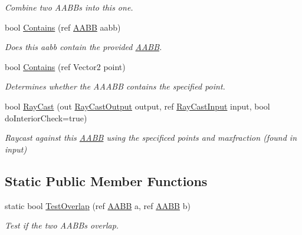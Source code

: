 \begin{DoxyCompactItemize}
\begin{DoxyCompactList}\small\item\em Combine two A\+A\+B\+Bs into this one. \end{DoxyCompactList}\item 
bool \hyperlink{struct_farseer_physics_1_1_collision_1_1_a_a_b_b_acc86c08d41c52dc6170f2a3e7d9187ff}{Contains} (ref \hyperlink{struct_farseer_physics_1_1_collision_1_1_a_a_b_b}{A\+A\+B\+B} aabb)
\begin{DoxyCompactList}\small\item\em Does this aabb contain the provided \hyperlink{struct_farseer_physics_1_1_collision_1_1_a_a_b_b}{A\+A\+B\+B}. \end{DoxyCompactList}\item 
bool \hyperlink{struct_farseer_physics_1_1_collision_1_1_a_a_b_b_a0ad83b468452fe8bd6c99bd0ad665446}{Contains} (ref Vector2 point)
\begin{DoxyCompactList}\small\item\em Determines whether the A\+A\+A\+B\+B contains the specified point. \end{DoxyCompactList}\item 
bool \hyperlink{struct_farseer_physics_1_1_collision_1_1_a_a_b_b_aa7aea235da2e73629a492a5214f58e63}{Ray\+Cast} (out \hyperlink{struct_farseer_physics_1_1_collision_1_1_ray_cast_output}{Ray\+Cast\+Output} output, ref \hyperlink{struct_farseer_physics_1_1_collision_1_1_ray_cast_input}{Ray\+Cast\+Input} input, bool do\+Interior\+Check=true)
\begin{DoxyCompactList}\small\item\em Raycast against this \hyperlink{struct_farseer_physics_1_1_collision_1_1_a_a_b_b}{A\+A\+B\+B} using the specificed points and maxfraction (found in input) \end{DoxyCompactList}\end{DoxyCompactItemize}
\subsection*{Static Public Member Functions}
\begin{DoxyCompactItemize}
\item 
static bool \hyperlink{struct_farseer_physics_1_1_collision_1_1_a_a_b_b_a1eee3e6c40da7e7bd8c1982cf7344d39}{Test\+Overlap} (ref \hyperlink{struct_farseer_physics_1_1_collision_1_1_a_a_b_b}{A\+A\+B\+B} a, ref \hyperlink{struct_farseer_physics_1_1_collision_1_1_a_a_b_b}{A\+A\+B\+B} b)
\begin{DoxyCompactList}\small\item\em Test if the two A\+A\+B\+Bs overlap. \end{DoxyCompactList}\end{DoxyCompactItemize}
